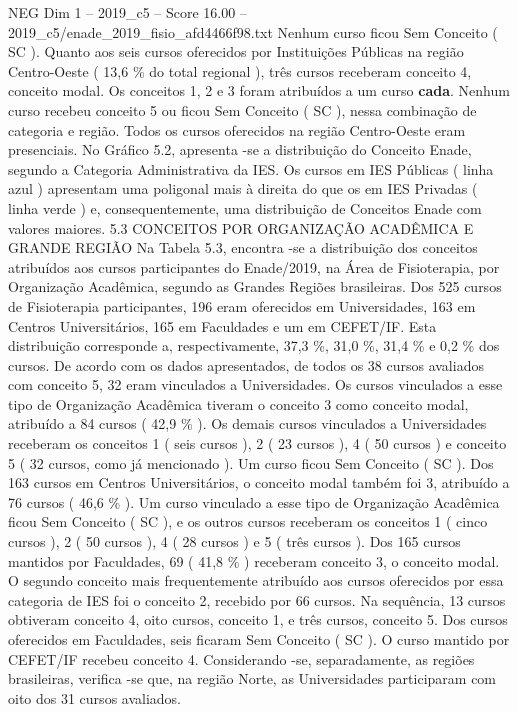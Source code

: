 \begin{textsample}{NEG Dim 1 – 2019\_c5 – Score 16.00 – 2019\_c5/enade\_2019\_fisio\_afd4466f98.txt}
Nenhum curso ficou Sem Conceito ( SC ).
Quanto aos seis cursos oferecidos por Instituições Públicas na região Centro-Oeste ( 13,6 \% do total regional ), três cursos receberam conceito 4, conceito modal.
Os conceitos 1, 2 e 3 foram atribuídos a um curso \textbf{cada}.
Nenhum curso recebeu conceito 5 ou ficou Sem Conceito ( SC ), nessa combinação de categoria e região.
Todos os cursos oferecidos na região Centro-Oeste eram presenciais.
No Gráfico 5.2, apresenta -se a distribuição do Conceito Enade, segundo a Categoria Administrativa da IES.
Os cursos em IES Públicas ( linha azul ) apresentam uma poligonal mais à direita do que os em IES Privadas ( linha verde ) e, consequentemente, uma distribuição de Conceitos Enade com valores maiores. 5.3 CONCEITOS POR ORGANIZAÇÃO ACADÊMICA E GRANDE REGIÃO Na Tabela 5.3, encontra -se a distribuição dos conceitos atribuídos aos cursos participantes do Enade/2019, na Área de Fisioterapia, por Organização Acadêmica, segundo as Grandes Regiões brasileiras.
Dos 525 cursos de Fisioterapia participantes, 196 eram oferecidos em Universidades, 163 em Centros Universitários, 165 em Faculdades e um em CEFET/IF.
Esta distribuição corresponde a, respectivamente, 37,3 \%, 31,0 \%, 31,4 \% e 0,2 \% dos cursos.
De acordo com os dados apresentados, de todos os 38 cursos avaliados com conceito 5, 32 eram vinculados a Universidades.
Os cursos vinculados a esse tipo de Organização Acadêmica tiveram o conceito 3 como conceito modal, atribuído a 84 cursos ( 42,9 \% ).
Os demais cursos vinculados a Universidades receberam os conceitos 1 ( seis cursos ), 2 ( 23 cursos ), 4 ( 50 cursos ) e conceito 5 ( 32 cursos, como já mencionado ).
Um curso ficou Sem Conceito ( SC ).
Dos 163 cursos em Centros Universitários, o conceito modal também foi 3, atribuído a 76 cursos ( 46,6 \% ).
Um curso vinculado a esse tipo de Organização Acadêmica ficou Sem Conceito ( SC ), e os outros cursos receberam os conceitos 1 ( cinco cursos ), 2 ( 50 cursos ), 4 ( 28 cursos ) e 5 ( três cursos ).
Dos 165 cursos mantidos por Faculdades, 69 ( 41,8 \% ) receberam conceito 3, o conceito modal.
O segundo conceito mais frequentemente atribuído aos cursos oferecidos por essa categoria de IES foi o conceito 2, recebido por 66 cursos.
Na sequência, 13 cursos obtiveram conceito 4, oito cursos, conceito 1, e três cursos, conceito 5.
Dos cursos oferecidos em Faculdades, seis ficaram Sem Conceito ( SC ).
O curso mantido por CEFET/IF recebeu conceito 4.
Considerando -se, separadamente, as regiões brasileiras, verifica -se que, na região Norte, as Universidades participaram com oito dos 31 cursos avaliados.

\end{textsample}
